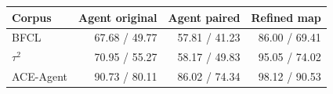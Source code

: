 \begin{tabular}{lrrr}
\toprule
Corpus & Agent original & Agent paired & Refined map \\
\midrule
BFCL & 67.68 / 49.77 & 57.81 / 41.23 & 86.00 / 69.41 \\
$\tau^2$ & 70.95 / 55.27 & 58.17 / 49.83 & 95.05 / 74.02 \\
ACE-Agent & 90.73 / 80.11 & 86.02 / 74.34 & 98.12 / 90.53 \\
\bottomrule
\end{tabular}
